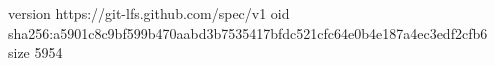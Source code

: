 version https://git-lfs.github.com/spec/v1
oid sha256:a5901c8c9bf599b470aabd3b7535417bfdc521cfc64e0b4e187a4ec3edf2cfb6
size 5954
